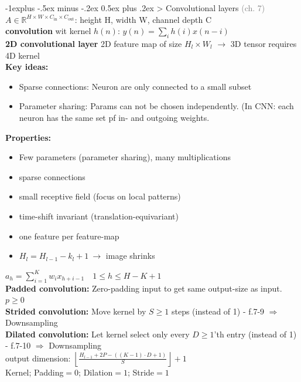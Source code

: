 \documentclass[a4paper,10pt,landscape]{article}
\makeatletter
\renewcommand{\subsection}{\@startsection{subsection}{2}{0mm}%
                                {-1explus -.5ex minus -.2ex}%
                                {0.5ex plus .2ex}%
                                {\normalfont\normalsize\bfseries}}
\makeatother
\begin{document}
\begin{multicols*}{3}
    \subsection{> Convolutional layers \textcolor{gray}{(ch. 7)}}
    $A \in \mathbb{R}^{H \times W \times C_\textrm{in}\times C_\textrm{out}}$: height H, width W, channel depth C \\
    \textbf{convolution} wit kernel $h(n)$: $y(n) = \sum_i h(i)x(n-i)$\\
    \textbf{2D convolutional layer} 2D feature map of size $H_l \times W_l$ $\rightarrow$ 3D tensor requires 4D kernel\\
    \textbf{Key ideas:}\\
    \begin{itemize}
        \item Sparse connections: Neuron are only connected to a small subset
        \item Parameter sharing: Params can not be chosen independently. (In CNN: each neuron has the same set pf in- and outgoing weights.
    \end{itemize}
    \textbf{Properties:}\\
    \begin{itemize}
        \item Few parameters (parameter sharing), many multiplications
        \item sparse connections
        \item small receptive field (focus on local patterns)
        \item time-shift invariant (translation-equivariant)
        \item one feature per feature-map
        \item $H_l = H_{l-1}-k_l+1 \ \rightarrow$ image shrinks
    \end{itemize}
    $a_h = \sum_{i=1}^Kw_ix_{h+i-1} \quad 1\leq h \leq H-K+1$\\
    \textbf{Padded convolution:} Zero-padding input to get same output-size as input. $p\geq 0$\\
    \textbf{Strided convolution:} Move kernel by $S\geq 1$ steps (instead of 1) - f.7-9 $\Rightarrow$ Downsampling\\
    \textbf{Dilated convolution:} Let kernel select only every $D \geq 1$'th entry (instead of 1) - f.7-10 $\Rightarrow$ Downsampling\\
    output dimension: $\left\lfloor \frac{H_{l-1}+2P-((K-1)\cdot D+1)}{S} \right\rfloor +1$\\
    Kernel; Padding$=0$; Dilation$=1$; Stride$=1$


\end{multicols*}
\end{document}
